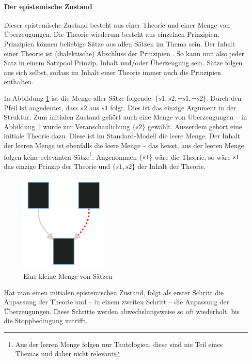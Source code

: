 \documentclass{article}
\begin{document}
\paragraph{Der epistemische Zustand} Dieser epistemische Zustand besteht aus einer Theorie und einer Menge von Überzeugungen. Die Theorie wiederum besteht aus einzelnen Prinzipien. Prinzipien können beliebige Sätze aus allen Sätzen im Thema sein. Der Inhalt einer Theorie ist (dialektische) Abschluss der Prinzipien \parencite[vgl.][S.~464]{beisbart_making_2021}. So kann nun also jeder Satz in einem Satzpool Prinzip, Inhalt und/oder Überzeugung sein. Sätze folgen aus sich selbst, sodass im Inhalt einer Theorie immer auch die Prinzipien enthalten.

In Abbildung \ref{fig:smallset} ist die Menge aller Sätze folgende: $\{s1,s2,\neg s1, \neg s2\}$. Durch den Pfeil ist angedeutet, dass $s2$ aus $s1$ folgt. Dies ist das einzige Argument in der Struktur. Zum initialen Zustand gehört auch eine Menge von Überzeugungen -- in Abbildung \ref{fig:smallset} wurde zur Veranschaulichung $\{s2\}$ gewählt. Ausserdem gehört eine initiale Theorie dazu. Diese ist im Standard-Modell die leere Menge. Der Inhalt der leeren Menge ist ebenfalls die leere Menge -- das heisst, aus der leeren Menge folgen keine relevanten Sätze\footnote{Aus der leeren Menge folgen nur Tautologien, diese sind nie Teil eines Themas und daher nicht relevant}. Angenommen $\{s1\}$ wäre die Theorie, so wäre $s1$ das einzige Prinzip der Theorie und $\{s1, s2\}$ der Inhalt der Theorie.

\begin{figure}[ht]
  \centering
  \includegraphics[width=\textwidth,height=5cm,keepaspectratio]{figure1}
  \caption{Eine kleine Menge von Sätzen\label{fig:smallset}}
\end{figure}

Hat man einen initialen epistemischen Zustand, folgt als erster Schritt die Anpassung der Theorie und -- in einem zweiten Schritt -- die Anpassung der Überzeugungen. Diese Schritte werden abwechslungsweise so oft wiederholt, bis die Stoppbedingung zutrifft. \parencite[vgl.][S.~449]{beisbart_making_2021}
\end{document}
